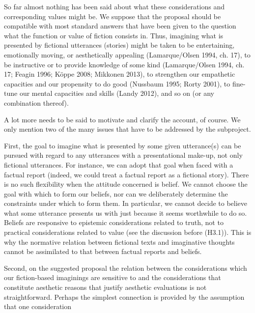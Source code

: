 So far almost nothing has been said about what these considerations and corresponding values might be. We suppose that the proposal should be compatible with most standard answers that have been given to the question what the function or value of fiction consists in. Thus, imagining what is presented by fictional utterances (stories) might be taken to be entertaining, emotionally moving, or aesthetically appealing (Lamarque/Olsen 1994, ch. 17), to be instructive or to provide knowledge of some kind (Lamarque/Olsen 1994, ch. 17; Feagin 1996; K\"oppe 2008; Mikkonen 2013), to strengthen our empathetic capacities and our propensity to do good (Nussbaum 1995; Rorty 2001), to fine-tune our mental capacities and skills (Landy 2012), and so on (or any combination thereof).

A lot more needs to be said to motivate and clarify the account, of course. We only mention two of the many issues that have to be addressed by the subproject.

First, the goal to imagine what is presented by some given utterance(s) can be pursued with regard to any utterances with a presentational make-up, not only fictional utterances. For instance, we can adopt that goal when faced with a factual report (indeed, we could treat a factual report as a fictional story). There is no such flexibility when the attitude concerned is belief. We cannot choose the goal with which to form our beliefs, nor can we deliberately determine the constraints under which to form them. In particular, we cannot decide to believe what some utterance presents us with just because it seems worthwhile to do so. Beliefs are responsive to epistemic considerations related to truth, not to practical considerations related to value (see the discussion before (H3.1)). This is why the normative relation between fictional texts and imaginative thoughts cannot be assimilated to that between factual reports and beliefs.

Second, on the suggested proposal the relation between the considerations which our fiction-based imaginings are sensitive to and the considerations that constitute aesthetic reasons that justify aesthetic evaluations is not straightforward. Perhaps the simplest connection is provided by the assumption that one consideration  
